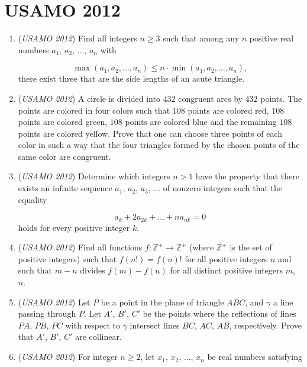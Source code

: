 \section{USAMO 2012}
        \begin{enumerate}
        	\item (\textit{USAMO 2012}) Find all integers $n \ge 3$ such that among any $n$ positive real numbers $a_1$, $a_2$, $\dots$, $a_n$ with

 \[\max(a_1, a_2, \dots, a_n) \le n \cdot \min(a_1, a_2, \dots, a_n),\]
there exist three that are the side lengths of an acute triangle.


 

	\item (\textit{USAMO 2012}) A circle is divided into $432$ congruent arcs by $432$ points.  The points are colored in four colors such that $108$ points are colored red,  $108$ points are colored green, $108$ points are colored blue  and the remaining $108$ points are colored yellow.  Prove that one can choose three points of each color in such a way that the four triangles formed by the chosen points of the same color are congruent.


 

	\item (\textit{USAMO 2012}) Determine which integers $n > 1$ have the property that there exists an infinite sequence $a_1$, $a_2$, $a_3$, $\dots$ of nonzero integers such that the equality

 \[a_k + 2a_{2k} + \dots + na_{nk} = 0\]
holds for every positive integer $k$.


 

	\item (\textit{USAMO 2012}) Find all functions $f : \mathbb{Z}^+ \to \mathbb{Z}^+$ (where $\mathbb{Z}^+$ is the set of positive integers) such that $f(n!) = f(n)!$ for all positive integers $n$ and such that $m - n$ divides $f(m) - f(n)$ for all distinct positive integers $m$, $n$.


 

	\item (\textit{USAMO 2012}) Let $P$ be a point in the plane of triangle $ABC$, and $\gamma$ a line passing through $P$.  Let $A'$, $B'$, $C'$ be the points where the reflections of lines $PA$, $PB$, $PC$ with respect to $\gamma$ intersect lines $BC$, $AC$, $AB$, respectively.  Prove that $A'$, $B'$, $C'$ are collinear.


 

	\item (\textit{USAMO 2012}) For integer $n \ge 2$, let $x_1$, $x_2$, $\dots$, $x_n$ be real numbers satisfying


\end{enumerate}
